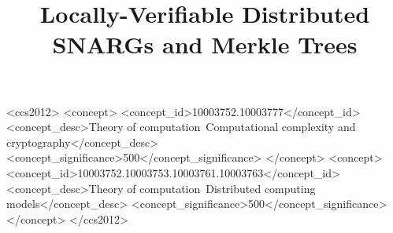 \documentclass[acmsmall,nonacm,anonymous]{acmart}
\begin{document}
\title{Locally-Verifiable Distributed SNARGs and Merkle Trees}



%

\begin{CCSXML}
<ccs2012>
   <concept>
       <concept_id>10003752.10003777</concept_id>
       <concept_desc>Theory of computation~Computational complexity and cryptography</concept_desc>
       <concept_significance>500</concept_significance>
       </concept>
   <concept>
       <concept_id>10003752.10003753.10003761.10003763</concept_id>
       <concept_desc>Theory of computation~Distributed computing models</concept_desc>
       <concept_significance>500</concept_significance>
       </concept>
 </ccs2012>
\end{CCSXML}




\maketitle

%
%
%
%




%
%
%

%
%



%



%

%
%
%
\end{document}
